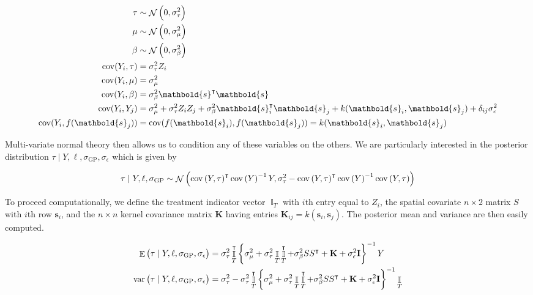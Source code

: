 \documentclass[letter]{article}
\DeclareMathOperator{\E}{\mathbb{E}}
\DeclareMathOperator{\cov}{{cov}}
\DeclareMathOperator{\var}{{var}}
\DeclareMathOperator{\Ind}{\mathbb{I}}
\DeclareMathOperator{\normal}{\mathcal{N}}
\newcommand{\trans}{^{\intercal}}
\newcommand{\sigmaf}{\sigma_{\mathrm{GP}}}
\newcommand{\sigman}{\sigma_{\epsilon}}
\newcommand{\sigmatau}{\sigma_{\tau}}
\newcommand{\sigmabeta}{\sigma_{\beta}}
\newcommand{\sigmamu}{\sigma_{\mu}}
\newcommand{\svec}{\mathbold{s}}
\newcommand{\vectreat}{\Ind_{T}}
\newcommand{\eye}{\mathbf{I}}
\newcommand{\K}{\mathbf{K}}
\begin{document}
\begin{equation}
\begin{split}
    \tau  &\sim \normal\del{0,\sigmatau^2} \\
    \mu   &\sim \normal\del{0,\sigmamu^2} \\
    \beta &\sim \normal\del{0,\sigmabeta^2} \\
    \cov(Y_i,\tau) &= \sigmatau^2 Z_i \\
    \cov(Y_i,\mu)  &= \sigmamu^2 \\
    \cov(Y_i,\beta)&= \sigmabeta^2 \svec\trans \svec \\
    \cov(Y_i,Y_j)&= \sigmamu^2 + \sigmatau^2 Z_i Z_j + \sigmabeta^2 \svec_i\trans \svec_j + k(\svec_i,\svec_j) + \delta_{ij}\sigman^2\\
    \cov(Y_i,f(\svec_j)) &= \cov(f(\svec_i),f(\svec_j)) = k(\svec_i,\svec_j)
\end{split}
\end{equation}

Multi-variate normal theory then allows us to condition any of these variables on the others. We are particularly interested in the posterior distribution \(\tau \mid Y, \ell, \sigmaf, \sigman\) which is given by

\begin{equation}
    \tau \mid Y, \ell, \sigmaf \sim \normal\del{\cov\del{Y,\tau}\trans \cov\del{Y}^{-1} Y, \sigma_\tau^2 - \cov\del{Y,\tau}\trans \cov\del{Y}^{-1} \cov\del{Y,\tau}}
\end{equation}

To proceed computationally, we define the treatment indicator vector \(\vectreat\) with \(i\)th entry equal to \(Z_i\), the spatial covariate \(n \times 2\) matrix \(S\) with \(i\)th row \(\svec_i\), and the \(n \times n\) kernel covariance matrix \(\K\) having entries \(\K_{ij}=k(\svec_i, \svec_j)\). The posterior mean and variance are then easily computed.

\begin{equation}\begin{split}
    \E \del{\tau \mid Y, \ell, \sigmaf, \sigman} &= \sigmatau^2 \vectreat\trans \cbr{\sigmamu^2 + \sigmatau^2 \vectreat \vectreat\trans + \sigmabeta^2 S S\trans + \K + \sigman^2 \eye }^{-1} Y \\
    \var \del{\tau \mid Y, \ell, \sigmaf, \sigman} &= \sigma_\tau^2 - \sigma_\tau^2 \vectreat\trans \cbr{\sigmamu^2 + \sigmatau^2 \vectreat \vectreat\trans + \sigmabeta^2 S S\trans + \K + \sigman^2 \eye }^{-1} \vectreat
\end{split}\end{equation}
\end{document}
